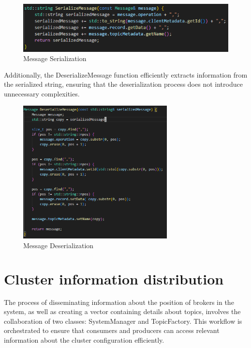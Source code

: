 \begin{figure}[H]
    \centering
    \includegraphics[width=1.0\textwidth]{Figures/implementation_serialize.png}
    \caption{Message Serialization}
\end{figure}

Additionally, the DeserializeMessage function efficiently extracts information
from the serialized string, ensuring that the deserialization process does not
introduce unnecessary complexities.

\begin{figure}[H]
    \centering
    \includegraphics[width=0.7\textwidth]{Figures/implementation_deserialize.png}
    \caption{Message Deserialization}
\end{figure}

\section{Cluster information distribution}

The process of disseminating information about the position of brokers in the
system, as well as creating a vector containing details about topics, involves
the collaboration of two classes: SystemManager and TopicFactory.
This workflow is orchestrated to ensure that consumers and producers can access
relevant information about the cluster configuration efficiently.

